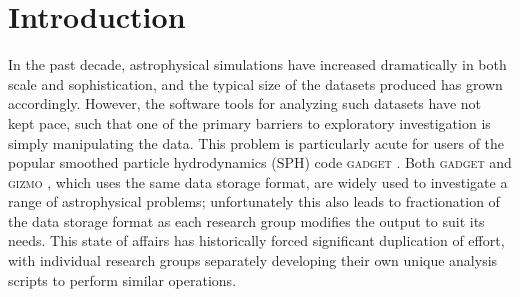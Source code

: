 \documentclass{emulateapj}
\begin{document}







\section{Introduction}
\label{sec:intro}

In the past decade, astrophysical simulations have increased dramatically in both scale and sophistication, and the typical size of the datasets produced has grown accordingly.  
However, the software tools for analyzing such datasets have not kept pace, such that one of the primary barriers to exploratory investigation is simply manipulating the data.  
This problem is particularly acute for users of the popular smoothed particle hydrodynamics (SPH) code \textsc{gadget} \citep{SpringelYoshidaWhite2001,Springel2005}.  
Both \textsc{gadget} and \textsc{gizmo} \citep{Hopkins2015}, which uses the same data storage format, are widely used to investigate a range of astrophysical problems; unfortunately this also leads to fractionation of the data storage format as each research group modifies the output to suit its needs.
This state of affairs has historically forced significant duplication of effort, with individual research groups separately developing their own unique analysis scripts to perform similar operations.
\end{document}
